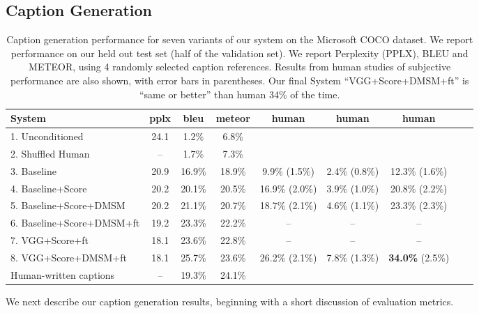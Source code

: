 \documentclass[10pt,twocolumn,letterpaper]{article}
\begin{document}
\subsection{Caption Generation}\label{sec:caption_generation}
\begin{table*}\centering\small
\caption{Caption generation performance for seven variants of our system on the Microsoft COCO dataset.   We report performance on our held out test set (half of the validation set). We report Perplexity (PPLX), BLEU and METEOR, using 4 randomly selected caption references. Results from human studies of subjective performance are also shown, with error bars in parentheses. Our final System ``VGG+Score+DMSM+ft'' is ``same or better'' than human 34\% of the time.}
\label{tab:mainresult}\vspace{1.5mm}
\begin{tabular}{lcccccccc}
\toprule
System & {\sc pplx} & {\sc bleu} & {\sc meteor} 
 & human & human & human \\
\midrule
1. Unconditioned                     & 24.1 & 1.2\%  &  6.8\%  \\
2. Shuffled Human                    & --   & 1.7\%  &  7.3\%  \\
3. Baseline                          & 20.9 & 16.9\% & 18.9\% &  9.9\% (1.5\%) & 2.4\% (0.8\%) & 12.3\% (1.6\%) \\
4. Baseline+Score                    & 20.2 & 20.1\% & 20.5\% & 16.9\% (2.0\%) & 3.9\% (1.0\%) & 20.8\% (2.2\%) \\
5. Baseline+Score+{\small DMSM}      & 20.2 & 21.1\% & 20.7\% & 18.7\% (2.1\%) & 4.6\% (1.1\%) & 23.3\% (2.3\%) \\
6. Baseline+Score+{\small DMSM}+ft   & 19.2 & 23.3\% & 22.2\% & -- & -- & --\\
7. VGG+Score+ft                      & 18.1 & 23.6\% & 22.8\% & -- & -- & --\\
8. VGG+Score+{\small DMSM}+ft        & 18.1 & 25.7\% & 23.6\% & 26.2\% (2.1\%)	& 7.8\% (1.3\%) & {\bf 34.0\%} (2.5\%)\\
\midrule
Human-written captions               & --   & 19.3\% & 24.1\% \\
\bottomrule
\end{tabular}
\vspace{-1em}
\end{table*}

We next describe our caption generation results, beginning with a short discussion of evaluation metrics.
\end{document}
